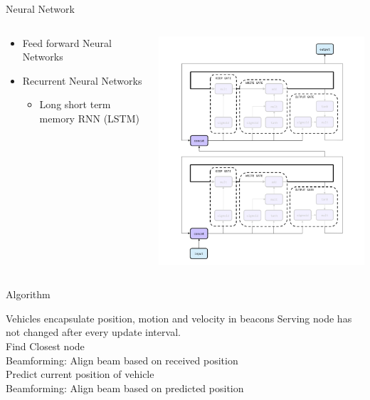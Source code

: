 \documentclass[10pt]{beamer}
\begin{document}
\begin{frame}{Neural Network}
\begin{columns}
\begin{column}{.4\textwidth}
\begin{itemize}[<+- | alert@+>]
    \item  Feed forward Neural Networks
    \item  Recurrent Neural Networks 
    \begin{itemize}
    \item Long short term memory RNN (LSTM)
    \end{itemize}
  \end{itemize}
  \end{column}
    \begin{column}{.5\textwidth}
\includegraphics[width=\textwidth]{src/lstmnet.png} 
\end{column}
  \end{columns}
\end{frame}

\begin{frame}{Algorithm}
\begin{algorithmic}
\Require Vehicles encapsulate position, motion and velocity in beacons
\Ensure Serving node has not changed after every update interval.
\\Find Closest node 
 \\Beamforming: Align beam based on received position
\Else
\\Predict current position of vehicle \\
 Beamforming: Align beam based on predicted position
 \EndIf
\EndIf
\end{algorithmic}
\end{frame}
\end{document}
